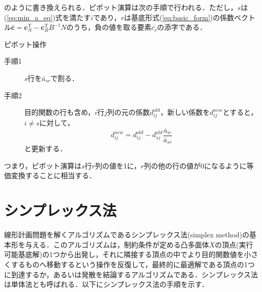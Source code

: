 \documentclass{jsreport}
\begin{document}
のように書き換えられる．ピボット演算は次の手順で行われる．ただし，$s$は(\ref{eq:min_a_eq})式を満たす$i$であり，$r$は基底形式(\ref{eq:basic_form})の係数ベクトル$\bar{\bm{c}} = \bm{c}_N^{\mathrm{T}} - \bm{c}_B^{\mathrm{T}}B^{-1}N$のうち，負の値を取る要素$\bar{c_r}$の添字である．
\begin{itembox}[l]{ピボット操作}
  \begin{description}
    \item[手順1] $s$行を$\bar{a}_{sr}$で割る．
    \item[手順2] 目的関数の行も含め，$i$行$j$列の元の係数$d_{ij}^{old}$，新しい係数を$d_{ij}^{new}$とすると，$i \neq s$に対して，
    \begin{equation}
      d_{ij}^{new} = d_{ij}^{old} - d_{sj}^{old} \frac{\bar{a}_{ir}}{\bar{a}_{sr}} \nonumber
    \end{equation}
    と更新する．
  \end{description}
\end{itembox}

つまり，ピボット演算は$s$行$r$列の値を1に，$r$列の他の行の値が$0$になるように等価変換することに相当する．

\section{シンプレックス法}
線形計画問題を解くアルゴリズムであるシンプレックス法(simplex method)の基本形を与える．このアルゴリズムは，制約条件が定める凸多面体$X$の頂点(実行可能基底解)の1つから出発し，それに隣接する頂点の中でより目的関数値を小さくするものへ移動するという操作を反復して，最終的に最適解である頂点の1つに到達するか，あるいは発散を結論するアルゴリズムである．シンプレックス法は単体法とも呼ばれる．以下にシンプレックス法の手順を示す．
\end{document}
